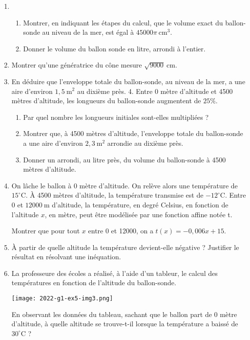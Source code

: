 \begin{enumerate}
  \item
  
  \begin{enumerate}
  	\item Montrer, en indiquant les étapes du calcul, que le volume exact du ballon-sonde au niveau de la mer, est égal à $45000 \pi~\mathrm{cm}^{3}$.
  	\item Donner le volume du ballon sonde en litre, arrondi à l'entier.
  \end{enumerate}

  \item Montrer qu'une génératrice du cône mesure $\sqrt{9000} \mathrm{~cm}$.

  \item En déduire que l'enveloppe totale du ballon-sonde, au niveau de la mer, a une aire d'environ $1,5 \mathrm{~m}^{2}$ au dixième près. 4. Entre 0 mètre d'altitude et 4500 mètres d'altitude, les longueurs du ballon-sonde augmentent de $25 \%$.
  
  \begin{enumerate}
  	\item Par quel nombre les longueurs initiales sont-elles multipliées ?
  	\item Montrer que, à 4500 mètres d'altitude, l'enveloppe totale du ballon-sonde a une aire d'environ $2,3 \mathrm{~m}^{2}$ arrondie au dixième près.
  	\item Donner un arrondi, au litre près, du volume du ballon-sonde à 4500 mètres d'altitude.
  \end{enumerate}

  \item On lâche le ballon à 0 mètre d'altitude. On relève alors une température de $15^{\circ} \mathrm{C}$. À 4500 mètres d'altitude, la température transmise est de $-12^{\circ} \mathrm{C}$. Entre 0 et $12000 \mathrm{~m}$ d'altitude, la température, en degré Celsius, en fonction de l'altitude $x$, en mètre, peut être modélisée par une fonction affine notée t.

Montrer que pour tout $x$ entre 0 et 12000, on a $t(x)=-0,006 x+15$.

  \item À partir de quelle altitude la température devient-elle négative ? Justifier le résultat en résolvant une inéquation.

  \item La professeure des écoles a réalisé, à l'aide d'un tableur, le calcul des températures en fonction de l'altitude du ballon-sonde.

\texttt{[image: 2022-g1-ex5-img3.png]}


En observant les données du tableau, sachant que le ballon part de 0 mètre d'altitude, à quelle altitude se trouve-t-il lorsque la température a baissé de $30^{\circ} \mathrm{C}$ ?

\end{enumerate}

